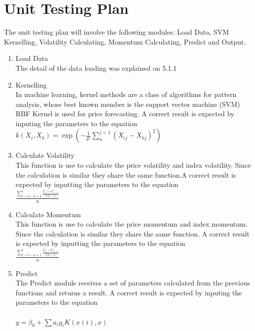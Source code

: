 \documentclass[12pt, titlepage]{article}
\begin{document}
\section{Unit Testing Plan}
The unit testing plan will involve the following modules: Load Data, SVM Kernelling, Volatility Calculating, Momentum Calculating, Predict and Output.\\
\begin{enumerate}

\item{ Load Data\\}
The detail of the data loading was explained on 5.1.1
\item{ Kernelling\\}
In machine learning, kernel methods are a class of algorithms for pattern analysis, whose best known member is the support vector machine (SVM)
RBF Kernel is used for price forecasting. A correct result is expected by inputing the parameters to the equation \\
$k\left (X_i,X_k\right )=\exp \left ( -\frac1{\delta^2}\sum_{n}^{j=1}(X_{ij}-X_{kj})^2 \right )$ \\

\item{ Calculate Volatility\\}
This function is use to calculate the price volatility and index volatility. Since the calculation is similar they share the same function.A correct result is expected by inputting the parameters to the equation \\
$\frac{\sum_{i=t-n+1}^{t} \frac{C_i-C_{i-1}}{C{i-1}}}{n}$ \\ 

\item{ Calculate Momentum\\}
This function is use to calculate the price momentum and index momentum. Since the calculation is similar they share the same function. A correct result is expected by inputting the parameters to the equation \\
$\frac{\sum_{i=t-n+1}^{t} \frac{C_i-C_{i-1}}{C{i-1}}}{n}$ \\ 

\item{Predict \\}
The Predict module receives a set of parameters calculated from the previous functions and returns a result. A correct result is expected by inputing the parameters to the equation \\\\
$y=\beta _0+\sum {a_iy_iK(x(i),x)}$\\

\end{enumerate} 
\end{document}
